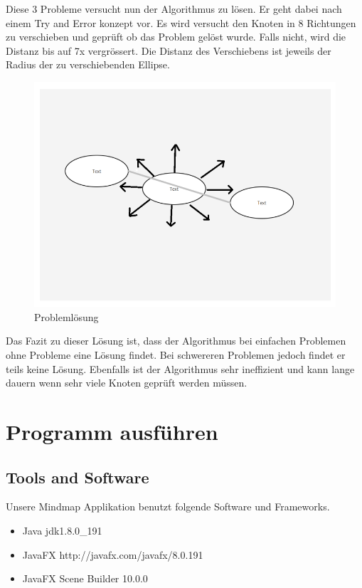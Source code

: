Diese 3 Probleme versucht nun der Algorithmus zu lösen. Er geht dabei nach einem Try and Error konzept vor. Es wird versucht den Knoten in 8 Richtungen zu verschieben und geprüft ob das Problem gelöst wurde. Falls nicht, wird die Distanz bis auf 7x vergrössert. Die Distanz des Verschiebens ist jeweils der Radius der zu verschiebenden Ellipse. 

\begin{figure}[H]
	\centering
		\includegraphics[scale=0.5]{images/solving.PNG}
	\caption{Problemlösung}
	\label{fig:problemloesung}
\end{figure}

Das Fazit zu dieser Lösung ist, dass der Algorithmus bei einfachen Problemen ohne Probleme eine Lösung findet. Bei schwereren Problemen jedoch findet er teils keine Lösung. Ebenfalls ist der Algorithmus sehr ineffizient und kann lange dauern wenn sehr viele Knoten geprüft werden müssen. 

\section{Programm ausführen}
\label{sec:run_program}

\subsection{Tools and Software}
\label{subsec:tools}
Unsere Mindmap Applikation benutzt folgende Software und Frameworks.
\begin{itemize}
\item Java jdk1.8.0\_{}191
\item JavaFX http://javafx.com/javafx/8.0.191
\item JavaFX Scene Builder 10.0.0
\end{itemize}

